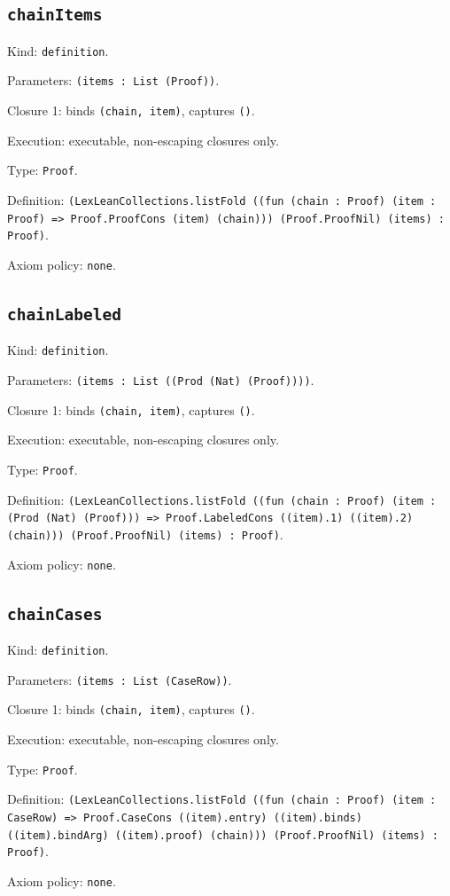 \documentclass[11pt]{article}
\begin{document}
\subsection*{\texttt{chainItems}}
\noindent Kind: \texttt{definition}.\par
\noindent Parameters: \texttt{(items : List (Proof))}.\par
\noindent Closure 1: binds \texttt{(chain, item)}, captures \texttt{()}.\par
\noindent Execution: executable, non-escaping closures only.\par
\noindent Type: \texttt{Proof}.\par
\noindent Definition: \texttt{(LexLeanCollections.listFold ((fun (chain : Proof) (item : Proof) => Proof.ProofCons (item) (chain))) (Proof.ProofNil) (items) : Proof)}.\par
\noindent Axiom policy: \texttt{none}.\par
\subsection*{\texttt{chainLabeled}}
\noindent Kind: \texttt{definition}.\par
\noindent Parameters: \texttt{(items : List ((Prod (Nat) (Proof))))}.\par
\noindent Closure 1: binds \texttt{(chain, item)}, captures \texttt{()}.\par
\noindent Execution: executable, non-escaping closures only.\par
\noindent Type: \texttt{Proof}.\par
\noindent Definition: \texttt{(LexLeanCollections.listFold ((fun (chain : Proof) (item : (Prod (Nat) (Proof))) => Proof.LabeledCons ((item).1) ((item).2) (chain))) (Proof.ProofNil) (items) : Proof)}.\par
\noindent Axiom policy: \texttt{none}.\par
\subsection*{\texttt{chainCases}}
\noindent Kind: \texttt{definition}.\par
\noindent Parameters: \texttt{(items : List (CaseRow))}.\par
\noindent Closure 1: binds \texttt{(chain, item)}, captures \texttt{()}.\par
\noindent Execution: executable, non-escaping closures only.\par
\noindent Type: \texttt{Proof}.\par
\noindent Definition: \texttt{(LexLeanCollections.listFold ((fun (chain : Proof) (item : CaseRow) => Proof.CaseCons ((item).entry) ((item).binds) ((item).bindArg) ((item).proof) (chain))) (Proof.ProofNil) (items) : Proof)}.\par
\noindent Axiom policy: \texttt{none}.\par
\end{document}
